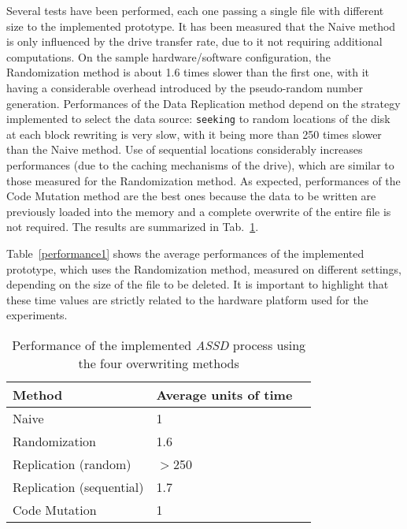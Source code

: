 \documentclass[10pt, conference, compsocconf]{IEEEtran}
\newcommand{\assd}{\emph{ASSD}\xspace}
\begin{document}
Several tests have been performed, each one passing a single file with different size to the implemented prototype.
It has been measured that the Naive method is only influenced by the drive transfer rate, due to it not requiring additional computations. On the sample hardware/software configuration, the Randomization method is about 1.6 times slower than the first one, with it having a considerable overhead introduced by the pseudo-random number generation. Performances of the Data Replication method depend on the strategy implemented to select the data source: \verb=seeking= to random locations of the disk at each block rewriting is very slow, with it being more than 250 times slower than the Naive method. Use of sequential locations considerably increases performances (due to the caching mechanisms of the drive), which are similar to those measured for the Randomization method. As expected, performances of the Code Mutation method are the best ones because the data to be written are previously loaded into the memory and a complete overwrite of the entire file is not required. The results are summarized in Tab.~\ref{performance}.

\noindent Table~\ref{performance1} shows the average performances of the implemented prototype, which uses the Randomization method, measured on different settings, depending on the size of the file to be deleted. It is important to highlight that these time values are strictly related to the hardware platform used for the experiments.


\begin{table}
\centering
\caption{Performance of the implemented \assd process using the four overwriting methods}
\begin{tabular}{ | l | l | l | }
\hline
\textbf{Method} & \textbf{Average units of time}\\
\hline
Naive & 1\\
\hline
Randomization & 1.6\\
\hline
Replication (random)& $>$250\\
\hline
Replication (sequential) & 1.7\\
\hline
Code Mutation & 1\\
\hline
\end{tabular}
\label{performance}
\end{table}

\balance
\end{document}
